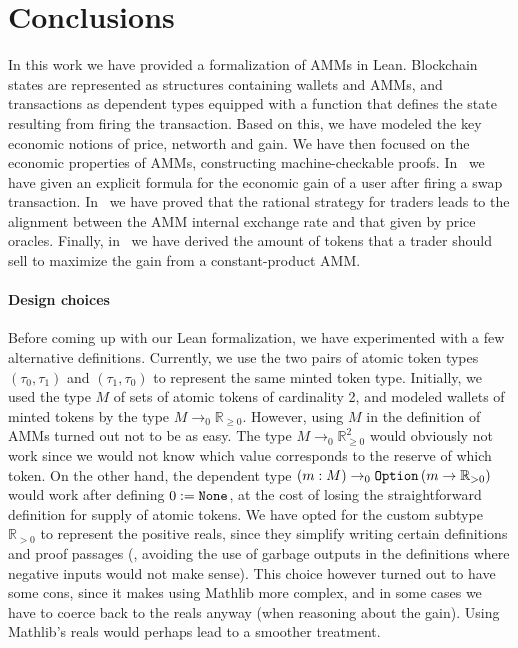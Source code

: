 \section{Conclusions}
\label{sec:conclusions}
In this work we have provided a formalization of AMMs in Lean. Blockchain states are represented as structures containing wallets and AMMs, and transactions as dependent types equipped with a function that defines the state resulting from firing the transaction. Based on this, we have modeled the key economic notions of price, networth and gain. We have then focused on the economic properties of AMMs, constructing machine-checkable proofs. In~ we have given an explicit formula for the economic gain of a user after firing a swap transaction. In~ we have proved that the rational strategy for traders leads to the alignment between the AMM internal exchange rate and that given by price oracles. Finally, in~ we have derived the amount of tokens that a trader should sell to maximize the gain from a constant-product AMM.

\paragraph*{Design choices}
Before coming up with our Lean formalization, we have experimented with a few alternative definitions.
%
Currently, we use the two pairs of atomic token types $\left(\tau_0,\tau_1\right)$ and $\left(\tau_1, \tau_0\right)$ to represent the same minted token type. 
Initially, we used the type $M$ of sets of atomic tokens of cardinality 2, and modeled wallets of minted tokens by the type $M \to_0 \mathbb R_{\geq 0}$. However, using $M$ in the definition of AMMs turned out not to be as easy. The type $M \to_0 \mathbb R_{\geq 0}^2$ would obviously not work since we would not know which value corresponds to the reserve of which token. On the other hand, the dependent type $\left(m: M\right) \to_0 \code{Option}\left(m \to \mathbb R_{>0}\right)$ would work after defining $0 := \code{None}$, at the cost of losing the straightforward definition for supply of atomic tokens.
%
We have opted for the custom subtype $\mathbb R_{>0}$ to represent the positive reals, since they simplify writing certain definitions and proof passages (\eg, avoiding the use of garbage outputs in the definitions where negative inputs would not make sense). 
This choice however turned out to have some cons, since it makes using Mathlib more complex, and in some cases we have to coerce back to the reals anyway (\eg when reasoning about the gain).
Using Mathlib's reals would perhaps lead to a smoother treatment.

